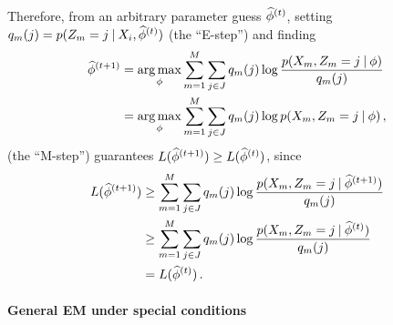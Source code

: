 Therefore, from an arbitrary parameter guess $\estsfs[t]$, setting $q_m(j) = \prob(\ct[m] = j \given \data_i, \estsfs[t])$ (the \enquote{E-step}) and finding
%
\begin{align}
    \estsfs[t + 1] 
    &= \argmax_\sfs \sum_{m = 1}^M \sum_{j \in J} q_m(j) \log \frac{\prob(\data[m], \ct[m] = j \given \sfs)}{q_m(j)} \nonumber \\
    &= \argmax_\sfs \sum_{m = 1}^M \sum_{j \in J} q_m(j) \log \prob(\data[m], \ct[m] = j \given \sfs) \, ,
\end{align}
%
(the \enquote{M-step}) guarantees $L(\estsfs[t + 1]) \geq L(\estsfs[t])$, since
%
\begin{align}
    L(\estsfs[t + 1])
    &\geq \sum_{m = 1}^M \sum_{j \in J} q_m(j) \log \frac{\prob(\data[m], \ct[m] = j \given \estsfs[t + 1])}{q_m(j)} \nonumber \\
    &\geq \sum_{m = 1}^M \sum_{j \in J} q_m(j) \log \frac{\prob(\data[m], \ct[m] = j \given \estsfs[t])}{q_m(j)} \nonumber \\
    &= L(\estsfs[t]) \, . 
\end{align}

\paragraph{General EM under special conditions}


